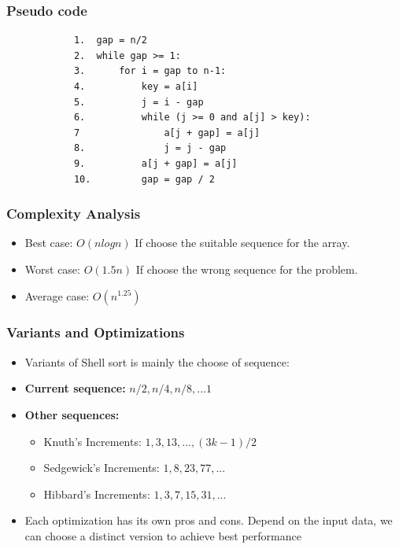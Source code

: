     \subsubsection{Pseudo code} 
        \begin{verbatim}
            1.  gap = n/2
            2.  while gap >= 1:
            3.      for i = gap to n-1:
            4.          key = a[i]
            5.          j = i - gap
            6.          while (j >= 0 and a[j] > key):
            7               a[j + gap] = a[j]
            8.              j = j - gap
            9.          a[j + gap] = a[j]
            10.         gap = gap / 2      
        \end{verbatim}

    \subsubsection{Complexity Analysis}
        \begin{itemize}
            \item Best case: $O(nlogn)$
            \subitem If choose the suitable sequence for the array.
            \item Worst case: $O(1.5n)$
            \subitem If choose the wrong sequence for the problem.
            \item Average case: $O(n^{1.25}) $
        \end{itemize}
    

    \subsubsection{Variants and Optimizations} 
    \begin{itemize}
        \item Variants of Shell sort is mainly the choose of sequence:
        \item \textbf{Current sequence: } $n/2,n/4,n/8,...1$
        \item \textbf{Other sequences: }
        \begin{itemize}
            \item Knuth's Increments: $1,3,13,...,(3k-1)/2$
            \item Sedgewick's Increments: $1,8,23,77,...$
            \item Hibbard's Increments: $1,3,7,15,31,...$
        \end{itemize}
        \item Each optimization has its own pros and cons. Depend on the input data, we can choose a distinct version to achieve best performance
    \end{itemize}
